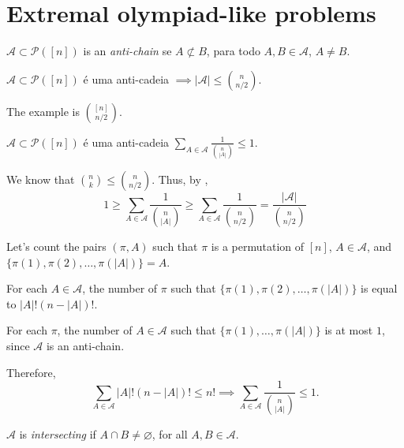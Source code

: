 \newpage\section{Extremal olympiad-like problems}

\begin{defn}
	$\mathcal{A} \subset \mathcal{P}([n])$ is an \emph{anti-chain} se  $A \not\subset B$, para todo $A, B \in \mathcal{A}$, $A \neq B$.
\end{defn}

\begin{thm}[Sperner, 1910's] \label{thm:sperner}
	$\mathcal A \subset \mathcal P([n])$ é uma anti-cadeia $\implies |\mathcal A| \le \binom{n}{n/2}$.
\end{thm}

The example is $\binom{[n]}{n/2}$.

\begin{lem}[LYMB, 1960's]\label{lem:lymb}
	$\mathcal A \subset \mathcal P([n])$ é uma anti-cadeia $\sum_{A \in \mathcal A} \frac{1}{\binom{n}{|A|}} \leq 1$.
\end{lem}

\begin{dem}
	We know that $\binom{n}{k} \le \binom{n}{n/2}$. Thus, by , \[
		1 \ge \sum_{A\in \mathcal{A}} \frac{1}{\binom{n}{|A|}} \ge \sum_{A\in \mathcal{A}} \frac{1}{\binom{n}{n/2}} = \frac{|\mathcal{A}|}{\binom{n}{n/2}}
	\]
\end{dem}

\begin{dem}
	Let's count the pairs $(\pi, A)$ such that $\pi$ is a permutation of $[n]$, $A \in \mathcal{A}$, and  $\{\pi(1), \pi(2), \dots, \pi(|A|)\} = A$.

	For each $A \in \mathcal{A}$, the number of $\pi$ such that $\{\pi(1), \pi(2), \dots, \pi(|A|)\}$ is equal to $|A|!(n - |A|)!$.

	For each $\pi$, the number of $A \in \mathcal{A}$ such that $\{\pi(1), \dots, \pi(|A|)\}$ is at most $1$, since $\mathcal{A}$ is an anti-chain.

	Therefore, \[
		\sum_{A \in \mathcal{A}} |A|!(n-|A|)! \le n!
		\implies
		\sum_{A \in \mathcal{A}} \frac{1}{\binom{n}{|A|}} \le 1.
	\]
\end{dem}

\begin{defn}
	$\mathcal{A}$ is \emph{intersecting} if $A \cap B \neq \varnothing$, for all  $A, B \in \mathcal{A}$.
\end{defn}


